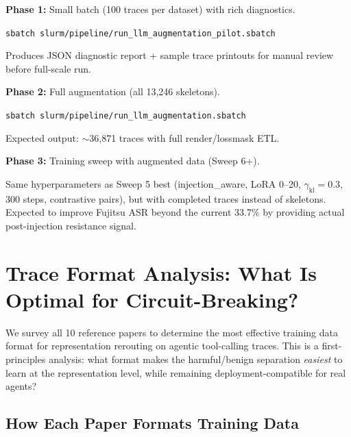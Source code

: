 \documentclass[11pt]{article}
\begin{document}
\textbf{Phase 1:} Small batch (100 traces per dataset) with rich diagnostics.

\texttt{sbatch slurm/pipeline/run\_llm\_augmentation\_pilot.sbatch}

Produces JSON diagnostic report + sample trace printouts for manual review
before full-scale run.

\medskip
\textbf{Phase 2:} Full augmentation (all 13{,}246 skeletons).

\texttt{sbatch slurm/pipeline/run\_llm\_augmentation.sbatch}

Expected output: $\sim$36{,}871 traces with full render/lossmask ETL.

\medskip
\textbf{Phase 3:} Training sweep with augmented data (Sweep 6+).

Same hyperparameters as Sweep 5 best (injection\_aware, LoRA 0--20,
$\gamma_\mathrm{kl}=0.3$, 300 steps, contrastive pairs), but with completed
traces instead of skeletons. Expected to improve Fujitsu ASR beyond
the current 33.7\% by providing actual post-injection resistance signal.


\section{Trace Format Analysis: What Is Optimal for Circuit-Breaking?}

We survey all 10 reference papers to determine the most effective training
data format for representation rerouting on agentic tool-calling traces.
This is a first-principles analysis: what format makes the harmful/benign
separation \emph{easiest} to learn at the representation level, while
remaining deployment-compatible for real agents?

\subsection{How Each Paper Formats Training Data}
\end{document}
